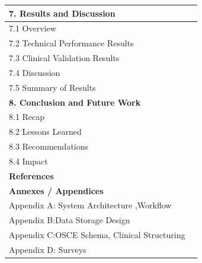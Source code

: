 \begin{longtable}{|p{13cm}|c|}
\textbf{7. Results and Discussion} & \pageref{chapter:results} \\ \hline
\hspace{0.6cm}7.1 Overview & \pageref{sec:results:overview} \\ \hline
\hspace{0.6cm}7.2 Technical Performance Results & \pageref{sec:results:accuracy} \\ \hline
\hspace{0.6cm}7.3 Clinical Validation Results & \pageref{sec:results:workflow} \\ \hline
\hspace{0.6cm}7.4 Discussion & \pageref{sec:results:comparison} \\ \hline
\hspace{0.6cm}7.5 Summary of Results & \pageref{sec:results:conclusion} \\ \hline


\textbf{8. Conclusion and Future Work} & \pageref{chapter:conclusion} \\ \hline
\hspace{0.6cm}8.1 Recap & \pageref{sec:conclusion:recap} \\ \hline
\hspace{0.6cm}8.2 Lessons Learned & \pageref{sec:conclusion:lessons} \\ \hline
\hspace{0.6cm}8.3 Recommendations & \pageref{sec:conclusion:recommend} \\ \hline
\hspace{0.6cm}8.4 Impact & \pageref{sec:conclusion:impact} \\ \hline

\textbf {References}& \pageref{chapter:References} \\ \hline

\textbf{Annexes / Appendices} & \\ \hline
Appendix A: System Architecture ,Workflow & \pageref{appendix:systema} \\ \hline
Appendix B:Data Storage Design & \pageref{appendix:dsb} \\ \hline
Appendix C:OSCE Schema, Clinical Structuring & \pageref{appendix:osce} \\ \hline
Appendix D: Surveys & \pageref{appendix:survey} \\ \hline


\end{longtable}

\endgroup
